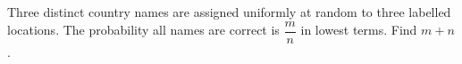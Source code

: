 Three distinct country names are assigned uniformly at random to three labelled locations. The probability all names are correct is $\dfrac{m}{n}$ in lowest terms. Find $m+n$.
